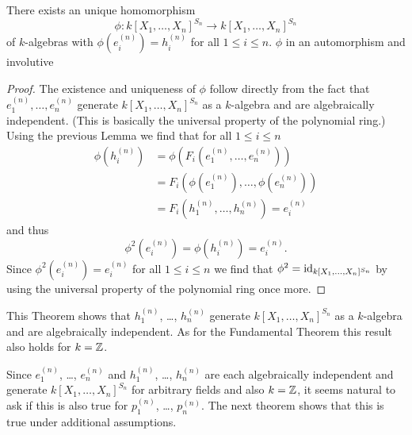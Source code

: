 \begin{thrm}
There exists an unique homomorphism
\[
 \phi \colon k[X_1, \dotsc, X_n]^{S_n} \to k[X_1, \dotsc, X_n]^{S_n}
\]
of $k$-algebras with $\phi\left(e^{(n)}_i\right) = h^{(n)}_i$ for all $1 \leq i \leq n$. $\phi$ in an automorphism and involutive
\end{thrm}
\begin{proof}
 The existence and uniqueness of $\phi$ follow directly from the fact that $e^{(n)}_1, \dotsc, e^{(n)}_n$ generate $k[X_1, \dotsc, X_n]^{S_n}$ as a $k$-algebra and are algebraically independent. (This is basically the universal property of the polynomial ring.) Using the previous Lemma we find that for all $1 \leq i \leq n$
 \begin{align*}
  \phi\left(h^{(n)}_i\right)
  &= \phi\left(F_i\left(e^{(n)}_1, \dotsc, e^{(n)}_n\right)\right) \\
  &= F_i\left(\phi\left(e^{(n)}_1\right), \dotsc, \phi\left(e^{(n)}_n\right)\right) \\
  &= F_i\left(h^{(n)}_1, \dotsc, h^{(n)}_n\right)
  = e^{(n)}_i
 \end{align*}
 and thus
 \[
  \phi^2\left(e^{(n)}_i\right) = \phi\left(h^{(n)}_i\right) = e^{(n)}_i.
 \]
 Since $\phi^2\left(e^{(n)}_i\right) = e^{(n)}_i$ for all $1 \leq i \leq n$ we find that $\phi^2 = \operatorname{id}_{k[X_1, \dotsc, X_n]^{S_n}}$ by using the universal property of the polynomial ring once more.
\end{proof}


This Theorem shows that $h^{(n)}_1$, \dots, $h^{(n)}_n$ generate $k[X_1, \dotsc, X_n]^{S_n}$ as a $k$-algebra and are algebraically independent. As for the Fundamental Theorem this result also holds for $k = \mathbb{Z}$.


Since $e^{(n)}_1$, \dots, $e^{(n)}_n$ and $h^{(n)}_1$, \dots, $h^{(n)}_n$ are each algebraically independent and generate $k[X_1, \dotsc, X_n]^{S_n}$ for arbitrary fields and also $k = \mathbb{Z}$, it seems natural to ask if this is also true for $p^{(n)}_1$, \dots, $p^{(n)}_n$. The next theorem shows that this is true under additional assumptions.


